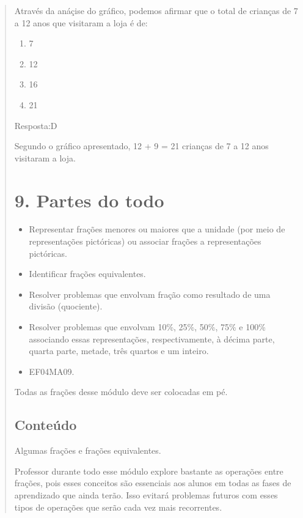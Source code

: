 \begin{enumerate}
\begin{escolha}
\begin{enumerate}
\begin{itemize}
\begin{itemize}
\begin{escolha}
\begin{quote}
\begin{escolha}
{Através da anáçise do gráfico, podemos afirmar que o total de crianças
de 7 a 12 anos que visitaram a loja é de:

\begin{enumerate}
\def\labelenumi{\alph{enumi})}
\item
  7
\item
  12
\item
  16
\item
  21
\end{enumerate}

Resposta:D

Segundo o gráfico apresentado, 12 + 9 = 21 crianças de 7 a 12 anos
visitaram a loja.

\section{9. Partes do todo}\label{muxf3dulo-9}


\begin{itemize}
\item Representar frações menores ou maiores que a unidade (por meio de
representações pictóricas) ou associar frações a representações pictóricas.
\item Identificar frações equivalentes.
\item Resolver problemas que envolvam fração como resultado de uma divisão
(quociente).
\item Resolver problemas que envolvam 10\%, 25\%, 50\%, 75\% e 100\%
associando essas representações, respectivamente, à décima parte, quarta parte, metade,
três quartos e um inteiro.
\end{itemize}


\begin{itemize}
\item EF04MA09.
\end{itemize}

Todas as frações desse módulo deve ser colocadas em pé.

\subsection{Conteúdo}\label{conteuxfado-8}

Algumas frações e frações equivalentes.

Professor durante todo esse módulo explore bastante as operações entre
frações, pois esses conceitos são essenciais aos alunos em todas as
fases de aprendizado que ainda terão. Isso evitará problemas futuros com
esses tipos de operações que serão cada vez mais recorrentes.

}
\end{escolha}
\end{quote}
\end{escolha}
\end{itemize}
\end{itemize}
\end{enumerate}
\end{escolha}
\end{enumerate}
